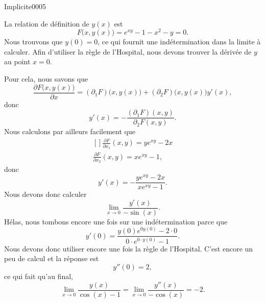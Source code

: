 
\begin{corrige}{Implicite0005}

	La relation de définition de $y(x)$ est
	\begin{equation}
		F\big( x,y(x) \big)=e^{xy}-1-x^2-y=0.
	\end{equation}
	Nous trouvons que $y(0)=0$, ce qui fournit une indétermination dans la limite à calculer. Afin d'utiliser la règle de l'Hospital, nous devons trouver la dérivée de $y$ au point $x=0$.

	Pour cela, nous savons que 
	\begin{equation}
		\frac{ \partial F\big( x,y(x) \big) }{ \partial x }=(\partial_1F)\big( x,y(x) \big)+(\partial_2F)\big( x,y(x) \big)y'(x),
	\end{equation}
	donc
	\begin{equation}
		y'(x)=-\frac{ (\partial_1F)(x,y) }{ \partial_2F(x,y) }.
	\end{equation}
	Nous calculons par ailleurs facilement que
	\begin{equation}
		\begin{aligned}[]
			\frac{ \partial F }{ \partial x_1}(x,y) =ye^{xy}-2x\\
			\frac{ \partial F }{ \partial x_2}(x,y) =xe^{xy}-1,
		\end{aligned}
	\end{equation}
	donc
	\begin{equation}
		y'(x)=-\frac{ ye^{xy}-2x }{ xe^{xy}-1 }.
	\end{equation}
	Nous devons donc calculer
	\begin{equation}
		\lim_{x\to 0} \frac{ y'(x) }{ -\sin(x) }.
	\end{equation}
	Hélas, nous tombons encore une fois sur une indétermination parce que
	\begin{equation}
		y'(0)=\frac{ y(0) e^{0y(0)}-2\cdot 0 }{ 0\cdot e^{0\cdot y(0)}-1 }.
	\end{equation}
	Nous devons donc utiliser encore une fois la règle de l'Hospital. C'est encore un peu de calcul et la réponse est
	\begin{equation}
		y''(0)=2,
	\end{equation}
	ce qui fait qu'au final,
	\begin{equation}
		\lim_{x\to 0} \frac{ y(x) }{ \cos(x)-1 }=\lim_{x\to 0} \frac{ y''(x) }{ -\cos(x) }=-2.
	\end{equation}
\end{corrige}
